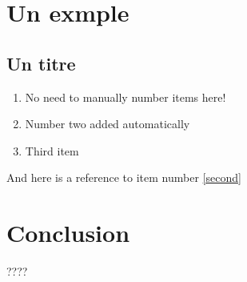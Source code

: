 \documentclass{article}
\begin{document}
\section{Un exmple}

\let\orilabel\label
\begin{LTXexample}[frame=none,preset=\let\label\orilabel]
\section{Un titre}

\begin{enumerate}
	\item No need to manually number items here!
	\item\label{second} Number two added automatically
	\item Third item
\end{enumerate}

And here is a reference to item number \ref{second}
\end{LTXexample}


	\section{Conclusion}
????
\end{document}
